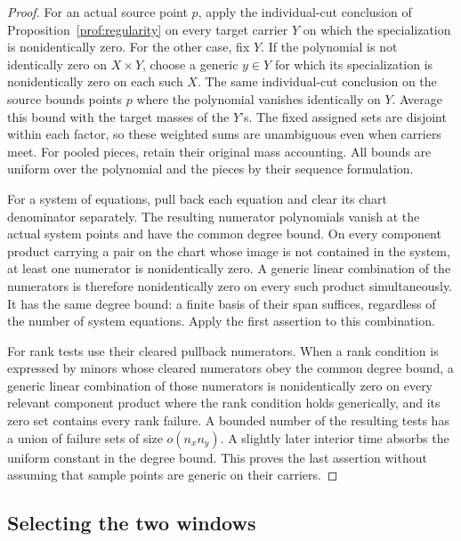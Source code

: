 \begin{proof}
For an actual source point $p$, apply the individual-cut conclusion
of Proposition~\ref{prof:regularity} on every target carrier $Y$
on which the specialization is nonidentically zero.
For the other case, fix $Y$.  If the polynomial is not identically
zero on $X\times Y$, choose a generic $y\in Y$ for which its
specialization is nonidentically zero on each such $X$.
The same individual-cut conclusion on the source bounds points $p$ where the polynomial vanishes
identically on $Y$.  Average this bound with the target masses of
the $Y$'s. The fixed assigned sets are disjoint within each factor,
so these weighted sums are unambiguous even when carriers meet.
For pooled pieces, retain their original mass accounting.
All bounds are uniform over the polynomial and the
pieces by their sequence formulation.

For a system of equations, pull back each equation and clear its
chart denominator separately. The resulting numerator polynomials
vanish at the actual system points and have the common degree bound.
On every component product carrying a pair on the chart whose image
is not contained in the system, at least one numerator is
nonidentically zero. A generic linear combination of the numerators
is therefore nonidentically zero on every such product
simultaneously. It has the same degree bound: a finite basis of
their span suffices, regardless of the number of system equations.
Apply the first assertion to this combination.

For rank tests use their cleared pullback numerators. When a rank
condition is expressed by minors whose cleared numerators obey the
common degree bound, a generic linear combination of those numerators
is nonidentically zero on every relevant component product where the
rank condition holds generically, and its zero set contains every
rank failure. A bounded number of the resulting
tests has a union of failure sets of size $o(n_xn_y)$. A slightly
later interior time absorbs the uniform constant in the degree
bound. This proves the last assertion without assuming that sample
points are generic on their carriers.
\end{proof}

\subsection{Selecting the two windows}

